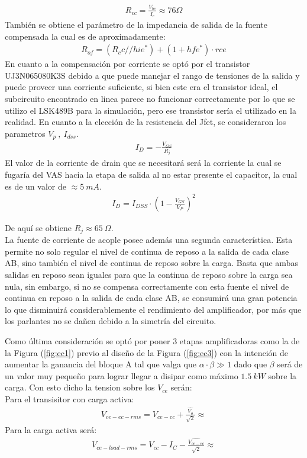 \begin{align}
R_{cc}=\frac{V_{be}}{I_c}\approx 76\Omega
\end{align}
También se obtiene el parámetro de la impedancia de salida de la fuente compensada la cual es de aproximadamente:
\begin{align}
R_{of} = (R_cc // hie^*)+(1+hfe^* )\cdot rce
\end{align}
En cuanto a la compensación por corriente se optó por el transistor UJ3N065080K3S debido a que puede manejar el rango de tensiones de la salida y puede proveer una corriente suficiente, si bien este era el transistor ideal, el subcircuito encontrado en linea parece no funcionar correctamente por lo que se utilizo el LSK489B para la simulación, pero ese transistor sería el utilizado en la realidad. En cuanto a la  elección de la resistencia del Jfet, se consideraron los parametros $V_p \ , \ I_{dss}$.
\begin{align}
I_D=-\frac{V_{GS}}{R_j}
\end{align}
El valor de la corriente de drain que se necesitará será la corriente la cual se fugaría del VAS hacia la etapa de salida al no estar presente el capacitor, la cual es de un valor de $\approx 5 \ mA$.
\begin{align}
I_D= I_{DSS} \cdot \left(1-\frac{V_{GS}}{V_P} \right)^2
\end{align}

De aquí se obtiene $R_j \approx 65 \ \Omega$.\\
La fuente de corriente de acople posee además una segunda característica. Esta permite no solo regular el nivel de continua de reposo a la salida de cada clase AB, sino también el nivel de continua de reposo sobre la carga. Basta que ambas salidas en reposo sean iguales para que la continua de reposo sobre la carga sea nula, sin embargo, si no se compensa correctamente con esta fuente el nivel de continua en reposo a la salida de cada clase AB, se consumirá una gran potencia lo que disminuirá considerablemente el rendimiento del amplificador, por más que los parlantes no se dañen debido a la simetría del circuito.

Como última consideración se optó por poner 3 etapas amplificadoras como la de la Figura (\ref{fig:ec1}) previo al diseño de la Figura (\ref{fig:ec3}) con la intención de aumentar la ganancia del bloque A tal  que valga que $\alpha \cdot \beta \gg 1$ dado que $\beta$ será de un valor muy pequeño para lograr llegar a disipar como máximo $1.5 \ kW$ sobre la carga.
Con esto dicho la tension sobre los $V_{ce}$ serán:\\
Para el transisitor con carga activa:
\begin{align}
V_{ce-ec-rms}= V_{ce-cc}+\frac{ \hat{V_o}}{\sqrt{2}}\approx 
\end{align}
Para la carga activa será:
\begin{align}
V_{ce-load-rms}= V_{cc}-I_C-\frac{\hat{V_{ce-ec}}}{\sqrt{2}}\approx
\end{align}


%
